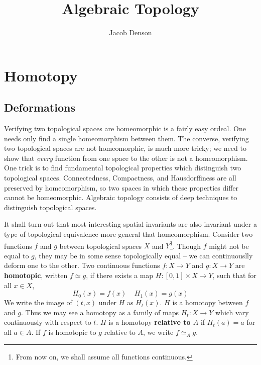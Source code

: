 

\DeclareMathOperator{\Dom}{Dom}

\title{Algebraic Topology}
\author{Jacob Denson}




\maketitle

\tableofcontents


\chapter{Homotopy}

\section{Deformations}

Verifying two topological spaces are homeomorphic is a fairly easy ordeal. One needs only find a single homeomorphism between them. The converse, verifying two topological spaces are not homeomorphic, is much more tricky; we need to show that {\it every} function from one space to the other is not a homeomorphism. One trick is to find fundamental topological properties which distinguish two topological spaces. Connectedness, Compactness, and Hausdorffiness are all preserved by homeomorphism, so two spaces in which these properties differ cannot be homeomorphic. Algebraic topology consists of deep techniques to distinguish topological spaces.

It shall turn out that most interesting spatial invariants are also invariant under a type of topological equivalence more general that homeomorphism. Consider two functions $f$ and $g$ between topological spaces $X$ and $Y$\footnote{From now on, we shall assume all functions continuous.}. Though $f$ might not be equal to $g$, they may be in some sense topologically equal -- we can continuouslly deform one to the other. Two continuous functions $f: X \to Y$ and $g:X \to Y$ are {\bf homotopic}, written $f \simeq g$, if there exists a map $H: [0,1] \times X \to Y$, such that for all $x \in X$,
%
\[ H_0(x) = f(x)\ \ \ \ \ H_1(x) = g(x) \]
%
We write the image of $(t,x)$ under $H$ as $H_t(x)$. $H$ is a homotopy between $f$ and $g$. Thus we may see a homotopy as a family of maps $H_t: X \to Y$ which vary continuously with respect to $t$. $H$ is a homotopy {\bf relative to $A$} if $H_t(a) = a$ for all $a \in A$. If $f$ is homotopic to $g$ relative to $A$, we write $f \simeq_A g$.

